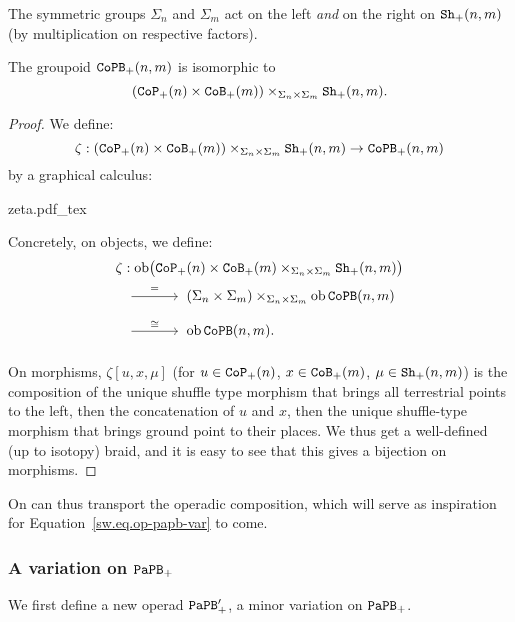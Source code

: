 \begin{remark}
  The symmetric groups $\Sigma_{n}$ and $\Sigma_{m}$ act on the left \emph{and} on the right on $\mathtt{Sh}_{+}(n,m)$ (by multiplication on respective factors).
\end{remark}

\begin{lemma}\label{sw.prop.zeta}
  The groupoid $\mathtt{CoPB}_{+}(n,m)$ is isomorphic to
  \[ (\mathtt{CoP}_{+}(n) \times \mathtt{CoB}_{+}(m)) \times_{\Sigma_{n} \times \Sigma_{m}} \mathtt{Sh}_{+}(n,m). \]
\end{lemma}
\begin{proof}
  We define:
  \[ \zeta : (\mathtt{CoP}_{+}(n) \times \mathtt{CoB}_{+}(m)) \times_{\Sigma_{n} \times \Sigma_{m}} \mathtt{Sh}_{+}(n,m) \to \mathtt{CoPB}_{+}(n,m) \]
  by a graphical calculus:
  \begin{center}
    \def\svgwidth{\textwidth} {zeta.pdf_tex}
  \end{center}

  Concretely, on objects, we define:
  \begin{align*}
    \zeta
    & : \ob \bigl( \CoP_{+}(n) \times \CoB_{+}(m) \times_{\Sigma_{n} \times \Sigma_{m}} \Sh_{+}(n,m) \bigr) \\
    & \tkrightarrow{=} (\Sigma_{n} \times \Sigma_{m}) \times_{\Sigma_{n} \times \Sigma_{m}} \ob \CoPB(n,m) \\
    & \tkrightarrow{\cong} \ob \CoPB(n,m).
  \end{align*}

  On morphisms, $\zeta[u,x,\mu]$ (for $u \in \mathtt{CoP}_{+}(n)$, $x \in \mathtt{CoB}_{+}(m)$, $\mu \in \mathtt{Sh}_{+}(n,m)$) is the composition of the unique shuffle type morphism that brings all terrestrial points to the left, then the concatenation of $u$ and $x$, then the unique shuffle-type morphism that brings ground point to their places.
  We thus get a well-defined (up to isotopy) braid, and it is easy to see that this gives a bijection on morphisms.
\end{proof}

On can thus transport the operadic composition, which will serve as inspiration for Equation~\eqref{sw.eq.op-papb-var} to come.

\subsubsection{A variation on \texorpdfstring{$\mathtt{PaPB}_+$}{PaPB+}}
\label{sw.sec.variation-papb_+}

We first define a new operad $\mathtt{PaPB}'_{+}$, a minor variation on $\mathtt{PaPB}_{+}$.

